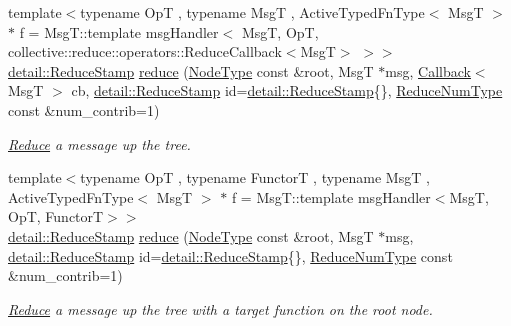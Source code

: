 \begin{DoxyCompactItemize}
{\footnotesize template$<$typename OpT , typename MsgT , Active\+Typed\+Fn\+Type$<$ Msg\+T $>$ $\ast$ f = Msg\+T\+::template msg\+Handler$<$      Msg\+T, Op\+T, collective\+::reduce\+::operators\+::\+Reduce\+Callback$<$\+Msg\+T$>$    $>$$>$ }\\\hyperlink{namespacevt_1_1collective_1_1reduce_1_1detail_aacc1fcd729d934ba143fee3a943bf9e7}{detail\+::\+Reduce\+Stamp} \hyperlink{structvt_1_1collective_1_1reduce_1_1_reduce_ac3fc898f5dec892d7d62e20ea9f6ac09}{reduce} (\hyperlink{namespacevt_a866da9d0efc19c0a1ce79e9e492f47e2}{Node\+Type} const \&root, MsgT $\ast$msg, \hyperlink{namespacevt_a36db99df4c973d48b1118a293fff533f}{Callback}$<$ MsgT $>$ cb, \hyperlink{namespacevt_1_1collective_1_1reduce_1_1detail_aacc1fcd729d934ba143fee3a943bf9e7}{detail\+::\+Reduce\+Stamp} id=\hyperlink{namespacevt_1_1collective_1_1reduce_1_1detail_aacc1fcd729d934ba143fee3a943bf9e7}{detail\+::\+Reduce\+Stamp}\{\}, \hyperlink{structvt_1_1collective_1_1reduce_1_1_reduce_a6c3e63aca10c31d2823b0b18cf9762a4}{Reduce\+Num\+Type} const \&num\+\_\+contrib=1)
\begin{DoxyCompactList}\small\item\em \hyperlink{structvt_1_1collective_1_1reduce_1_1_reduce}{Reduce} a message up the tree. \end{DoxyCompactList}\item 
{\footnotesize template$<$typename OpT , typename FunctorT , typename MsgT , Active\+Typed\+Fn\+Type$<$ Msg\+T $>$ $\ast$ f = Msg\+T\+::template msg\+Handler$<$\+Msg\+T, Op\+T, Functor\+T$>$$>$ }\\\hyperlink{namespacevt_1_1collective_1_1reduce_1_1detail_aacc1fcd729d934ba143fee3a943bf9e7}{detail\+::\+Reduce\+Stamp} \hyperlink{structvt_1_1collective_1_1reduce_1_1_reduce_ad8cc041ce827d4b9240a4e7dc309791e}{reduce} (\hyperlink{namespacevt_a866da9d0efc19c0a1ce79e9e492f47e2}{Node\+Type} const \&root, MsgT $\ast$msg, \hyperlink{namespacevt_1_1collective_1_1reduce_1_1detail_aacc1fcd729d934ba143fee3a943bf9e7}{detail\+::\+Reduce\+Stamp} id=\hyperlink{namespacevt_1_1collective_1_1reduce_1_1detail_aacc1fcd729d934ba143fee3a943bf9e7}{detail\+::\+Reduce\+Stamp}\{\}, \hyperlink{structvt_1_1collective_1_1reduce_1_1_reduce_a6c3e63aca10c31d2823b0b18cf9762a4}{Reduce\+Num\+Type} const \&num\+\_\+contrib=1)
\begin{DoxyCompactList}\small\item\em \hyperlink{structvt_1_1collective_1_1reduce_1_1_reduce}{Reduce} a message up the tree with a target function on the root node. \end{DoxyCompactList}\item 

\end{DoxyCompactItemize}
